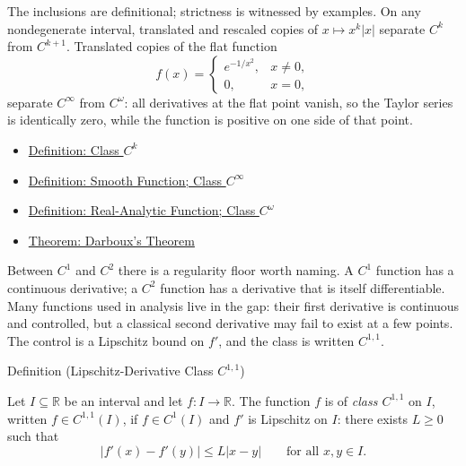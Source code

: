 \begin{remark*}[Interpretation]
The inclusions are definitional; strictness is witnessed by examples. On any nondegenerate interval, translated and rescaled copies of \(x\mapsto x^k|x|\) separate \(C^k\) from \(C^{k+1}\). Translated copies of the flat function
\[
  f(x)=
  \begin{cases}
    e^{-1/x^2}, & x\neq 0,\\
    0, & x=0,
  \end{cases}
\]
separate \(C^\infty\) from \(C^\omega\): all derivatives at the flat point vanish, so the Taylor series is identically zero, while the function is positive on one side of that point.
\end{remark*}

\begin{dependencies}
\begin{itemize}
  \item \hyperref[def:class-ck]{Definition: Class \(C^k\)}
  \item \hyperref[def:class-cinfty]{Definition: Smooth Function; Class \(C^\infty\)}
  \item \hyperref[def:class-comega]{Definition: Real-Analytic Function; Class \(C^\omega\)}
  \item \hyperref[thm:darboux]{Theorem: Darboux's Theorem}
\end{itemize}
\end{dependencies}

\begin{remark*}
Between \(C^1\) and \(C^2\) there is a regularity floor worth naming. A
\(C^1\) function has a continuous derivative; a \(C^2\) function has a
derivative that is itself differentiable. Many functions used in analysis
live in the gap: their first derivative is continuous and controlled, but a
classical second derivative may fail to exist at a few points. The control is
a Lipschitz bound on \(f'\), and the class is written \(C^{1,1}\).
\end{remark*}



\begin{definitionbox}{Definition (Lipschitz-Derivative Class \(C^{1,1}\))}
\begin{definition}
\label{def:class-c11}
Let \(I\subseteq\mathbb{R}\) be an interval and let \(f:I\to\mathbb{R}\).
The function \(f\) is of \emph{class \(C^{1,1}\)} on \(I\), written
\(f\in C^{1,1}(I)\), if \(f\in C^1(I)\) and \(f'\) is Lipschitz on \(I\):
there exists \(L\geq 0\) such that
\[
  |f'(x)-f'(y)|\leq L|x-y|
  \qquad\text{for all }x,y\in I.
\]
\end{definition}
\end{definitionbox}

